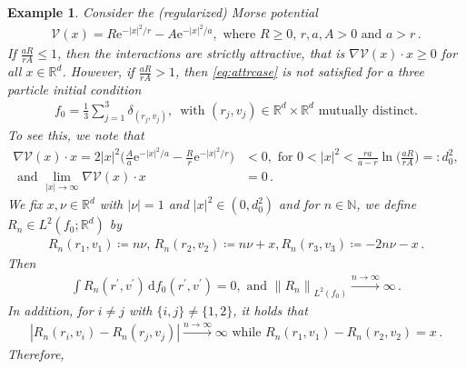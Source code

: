 \documentclass[11pt]{article}
\newtheorem{example}[theorem]{Example}
\newcommand{\R}[0]{\mathbb R}
\newcommand{\N}[0]{\mathbb N}
\newcommand{\masssum}[2]{ \frac{1}{#2} \sum_{#1 = 1}^{#2}  }
\newcommand{\norm}[1]{\left\| #1 \right\|}
\newcommand{\abs}[1]{\left| #1 \right|}
\newcommand{\msolinit}[1]{f_0(#1)}
\begin{document}
\begin{bibunit}[unsrtnat]
    \begin{example}\label{ex:morsecounterex}
        Consider the (regularized) Morse potential 
        \begin{align}
            \mathcal{V}(x) = R \mathrm{e}^{-\abs{x}^2 / {r} } - A \mathrm{e}^{- \abs{x}^2 / a} , \text{ where } R \geq 0, \,  r,a,A > 0 \text{ and } a > r \, . \label{eq:regMorse}
        \end{align}
        If $\frac{a R}{r A} \leq 1$, then the interactions are strictly attractive, that is $\nabla \mathcal{V}(x) \cdot x \geq 0$ for all $x \in \R^d$. However, if $\frac{a R}{r A} > 1$, then \eqref{eq:attrcase} is not satisfied for a three particle initial condition 
        \begin{align*}
            f_0 = \masssum{j}{3} \delta_{(r_j, v_j)}, \, \text{ with } (r_j, v_j) \in \R^d \times \R^d \text{ mutually distinct.}  
        \end{align*} 
        To see this, we note that 
        \begin{align*}
            \nabla \mathcal{V}(x) \cdot x = 2 \abs{x}^2 \Big( \frac{A}{a} \mathrm{e}^{ - \abs{x}^2 /{a}} - \frac{R}{r} \mathrm{e}^{-\abs{x}^2/{r} } \Big) &< 0, \text{ for } 0 < \abs{x}^2 < \frac{ra}{a-r} \ln \Big( \frac{aR}{rA} \Big) = : d_0^2  , \\
            \text{ and } \lim\limits_{\abs{x} \to \infty} \nabla \mathcal{V}(x) \cdot x &= 0 \, .
        \end{align*}
        We fix $x,\nu \in \R^d$ with $\abs{\nu} = 1$ and $\abs{x}^2 \in (0,d_0^2 ) $ and for $n \in \N$, we define $R_n \in L^2(f_0;\R^d )$ by 
        \begin{align*}
            R_n(r_1, v_1) \coloneq n \nu, \, R_n(r_2, v_2) \coloneq n \nu + x, R_n(r_3,v_3) \coloneq - 2n \nu - x \, .  
        \end{align*}
        Then 
        \begin{align*}
            \int R_n(r^\prime, v^\prime) \, \mathrm{d} \msolinit{r^\prime, v^\prime} = 0, \text{ and } \norm{R_n}_{L^2(f_0)} \stackrel{n \to \infty}{\to} \infty \, .
        \end{align*}
        In addition, for $i \neq j$ with $\{ i, j \} \neq \{ 1,2 \} $, it holds that 
        \begin{align*}
            \abs{R_n(r_i,v_i) - R_n(r_j,v_j) } \stackrel{n \to \infty}{\to} \infty 
            \text{ while } R_n(r_1,v_1) - R_n(r_2,v_2)  = x \, .
        \end{align*}
        Therefore, 
        \begin{align}

\end{align}
\end{example}
\end{bibunit}
\end{document}
